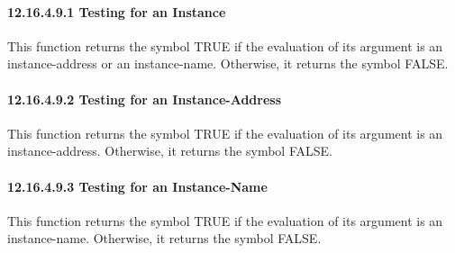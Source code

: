 \documentclass[letterpaper,10pt,english]{sphinxmanual}
\begin{document}
\paragraph{12.16.4.9.1 Testing for an Instance}
\label{\detokenize{actions:testing-for-an-instance}}
This function returns the symbol TRUE if the evaluation of its argument
is an instance-address or an instance-name. Otherwise, it returns the
symbol FALSE.


\begin{sphinxVerbatim}[commandchars=\\\{\}]
 
\end{sphinxVerbatim}


\paragraph{12.16.4.9.2 Testing for an Instance-Address}
\label{\detokenize{actions:testing-for-an-instance-address}}
This function returns the symbol TRUE if the evaluation of its argument
is an instance-address. Otherwise, it returns the symbol FALSE.


\begin{sphinxVerbatim}[commandchars=\\\{\}]
 
\end{sphinxVerbatim}


\paragraph{12.16.4.9.3 Testing for an Instance-Name}
\label{\detokenize{actions:testing-for-an-instance-name}}
This function returns the symbol TRUE if the evaluation of its argument
is an instance-name. Otherwise, it returns the symbol FALSE.


\begin{sphinxVerbatim}[commandchars=\\\{\}]
 
\end{sphinxVerbatim}
\end{document}
